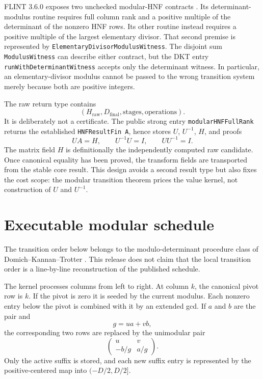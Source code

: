 \documentclass[11pt]{article}
\newcommand{\code}[1]{\texttt{#1}}
\begin{document}
FLINT 3.6.0 exposes two unchecked modular-HNF contracts
\citep{flint360fmpzmat}.  Its determinant-modulus routine requires full column
rank and a positive multiple of the determinant of the nonzero HNF rows.  Its
other routine instead requires a positive multiple of the largest elementary
divisor.  That second premise is represented by
\code{ElementaryDivisorModulusWitness}.  The disjoint sum
\code{ModulusWitness} can describe either contract, but the DKT entry
\code{runWithDeterminantWitness} accepts only the determinant witness.  In
particular, an elementary-divisor modulus cannot be passed to the wrong
transition system merely because both are positive integers.

The raw return type contains
\[
  (H_{\mathrm{raw}},D_{\mathrm{final}},\text{stages},\text{operations}).
\]
It is deliberately not a certificate.  The public strong entry
\code{modularHNFFullRank} returns the established
\code{HNFResultFin A}, hence stores $U$, $U^{-1}$, $H$, and proofs
\[
  UA=H,\qquad U^{-1}U=I,\qquad UU^{-1}=I.
\]
The matrix field $H$ is definitionally the independently computed raw
candidate.  Once canonical equality has been proved, the transform fields are
transported from the stable core result.  This design avoids a second result
type but also fixes the cost scope: the modular transition theorem prices the
value kernel, not construction of $U$ and $U^{-1}$.

\section{Executable modular schedule}

The transition order below belongs to the modulo-determinant procedure class of
Domich--Kannan--Trotter \citep{domichKannanTrotter1987}.  This release does not
claim that the local transition order is a line-by-line reconstruction of the
published schedule.

The kernel processes columns from left to right.  At column $k$, the canonical
pivot row is $k$.  If the pivot is zero it is seeded by the current modulus.
Each nonzero entry below the pivot is combined with it by an extended gcd.  If
$a$ and $b$ are the pair and
\[
  g=ua+vb,
\]
the corresponding two rows are replaced by the unimodular pair
\[
  \begin{pmatrix}
    u&v\\
    -b/g&a/g
  \end{pmatrix}.
\]
Only the active suffix is stored, and each new suffix entry is represented by
the positive-centered map into $(-D/2,D/2]$.
\end{document}
